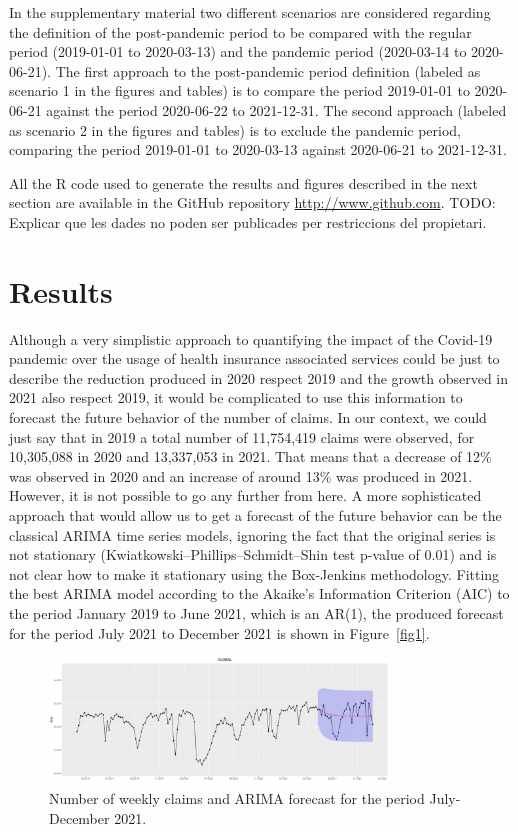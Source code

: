 \documentclass[12pt]{article}
\theoremstyle{definition}
\theoremstyle{remark}
\begin{document}
In the supplementary material two different scenarios are considered regarding the definition of the post-pandemic period to be compared with the regular period (2019-01-01 to 2020-03-13) and the pandemic period (2020-03-14 to 2020-06-21). The first approach to the post-pandemic period definition (labeled as scenario 1 in the figures and tables) is to compare the period 2019-01-01 to 2020-06-21 against the period 2020-06-22 to 2021-12-31. The second approach (labeled as scenario 2 in the figures and tables) is to exclude the pandemic period, comparing the period 2019-01-01 to 2020-03-13 against 2020-06-21 to 2021-12-31. 

All the R code used to generate the results and figures described in the next section are available in the GitHub repository \url{http://www.github.com}. TODO: Explicar que les dades no poden ser publicades per restriccions del propietari.

\section{Results}\label{results}
Although a very simplistic approach to quantifying the impact of the Covid-19 pandemic over the usage of health insurance associated services could be just to describe the reduction produced in 2020 respect 2019 and the growth observed in 2021 also respect 2019, it would be complicated to use this information to forecast the future behavior of the number of claims. In our context, we could just say that in 2019 a total number of 11,754,419 claims were observed, for 10,305,088 in 2020 and 13,337,053 in 2021. That means that a decrease of 12\% was observed in 2020 and an increase of around 13\% was produced in 2021. However, it is not possible to go any further from here. A more sophisticated approach that would allow us to get a forecast of the future behavior can be the classical ARIMA time series models, ignoring the fact that the original series is not stationary (Kwiatkowski–Phillips–Schmidt–Shin test p-value of 0.01) and is not clear how to make it stationary using the Box-Jenkins methodology. Fitting the best ARIMA model according to the Akaike's Information Criterion (AIC) to the period January 2019 to June 2021, which is an AR(1), the produced forecast for the period July 2021 to December 2021 is shown in Figure~\ref{fig1}. 

\begin{center}
  \begin{figure}[H]
    \includegraphics[width=9cm]{Results/arima_global_prediction.png}\caption{Number of weekly claims and ARIMA forecast for the period July-December 2021.}
  \end{figure}\label{fig1}
\end{center}
\end{document}
